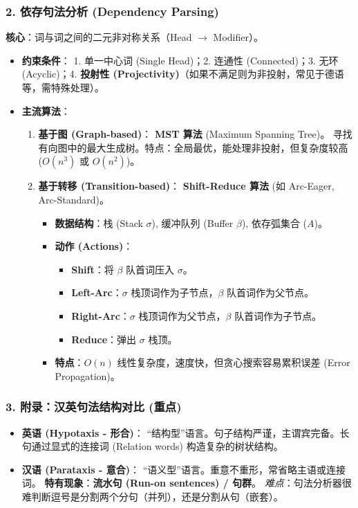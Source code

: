 \documentclass[a4paper, 11pt]{ctexart}
\begin{document}
\subsubsection{2. 依存句法分析 (Dependency Parsing)}
\textbf{核心}：词与词之间的二元非对称关系（Head $\to$ Modifier）。
\begin{itemize}
    \item \textbf{约束条件}：
    1. 单一中心词 (Single Head)；2. 连通性 (Connected)；3. 无环 (Acyclic)；4. \textbf{投射性 (Projectivity)}（如果不满足则为非投射，常见于德语等，需特殊处理）。
    \item \textbf{主流算法}：
    \begin{enumerate}
        \item \textbf{基于图 (Graph-based)}：
        \textbf{MST 算法} (Maximum Spanning Tree)。
        寻找有向图中的最大生成树。特点：全局最优，能处理非投射，但复杂度较高 ($O(n^3)$ 或 $O(n^2)$)。
        \item \textbf{基于转移 (Transition-based)}：
        \textbf{Shift-Reduce 算法} (如 Arc-Eager, Arc-Standard)。
        \begin{itemize}
            \item \textbf{数据结构}：栈 (Stack $\sigma$), 缓冲队列 (Buffer $\beta$), 依存弧集合 ($A$)。
            \item \textbf{动作 (Actions)}：
            \begin{itemize}
                \item \textbf{Shift}：将 $\beta$ 队首词压入 $\sigma$。
                \item \textbf{Left-Arc}：$\sigma$ 栈顶词作为子节点，$\beta$ 队首词作为父节点。
                \item \textbf{Right-Arc}：$\sigma$ 栈顶词作为父节点，$\beta$ 队首词作为子节点。
                \item \textbf{Reduce}：弹出 $\sigma$ 栈顶。
            \end{itemize}
            \item \textbf{特点}：$O(n)$ 线性复杂度，速度快，但贪心搜索容易累积误差 (Error Propagation)。
        \end{itemize}
    \end{enumerate}
\end{itemize}

\subsubsection{3. 附录：汉英句法结构对比 (重点)}
\begin{itemize}
    \item \textbf{英语 (Hypotaxis - 形合)}：
    “结构型”语言。句子结构严谨，主谓宾完备。长句通过显式的连接词 (Relation words) 构造复杂的树状结构。
    \item \textbf{汉语 (Parataxis - 意合)}：
    “语义型”语言。重意不重形，常省略主语或连接词。
    \textbf{特有现象}：\textbf{流水句 (Run-on sentences) / 句群}。
    \textit{难点}：句法分析器很难判断逗号是分割两个分句（并列），还是分割从句（嵌套）。
\end{itemize}
\end{document}
